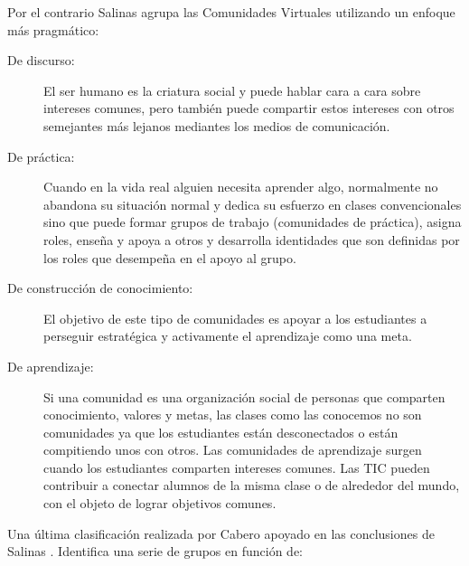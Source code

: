 Por el contrario Salinas \cite{salinas:2003} agrupa las Comunidades Virtuales utilizando un enfoque más pragmático: 

\begin{description}
\item[De discurso: ] 
El ser humano es la criatura social y puede hablar cara a cara sobre intereses comunes, pero también puede compartir estos intereses con otros semejantes más lejanos mediantes los medios de comunicación. 

\item[De práctica: ] 
Cuando en la vida real alguien necesita aprender algo, normalmente no abandona su situación normal y dedica su esfuerzo en clases convencionales sino que puede formar grupos de trabajo (comunidades de práctica), asigna roles, enseña y apoya a otros y desarrolla identidades que son definidas por los roles que desempeña en el apoyo al grupo. 

\item[De construcción de conocimiento: ] 
El objetivo de este tipo de comunidades es apoyar a los estudiantes a perseguir estratégica y activamente el aprendizaje como una meta. 

\item[De aprendizaje: ] 
Si una comunidad es una organización social de personas que comparten conocimiento, valores y metas, las clases como las conocemos no son comunidades ya que los estudiantes están desconectados o están compitiendo unos con otros. Las comunidades de aprendizaje surgen cuando los estudiantes comparten intereses comunes. Las TIC pueden contribuir a conectar alumnos de la misma clase o de alrededor del mundo, con el objeto de lograr objetivos comunes. 

\end{description}

Una última clasificación realizada por Cabero \cite{cabero} apoyado en las conclusiones de Salinas \cite{salinas:2003}. Identifica una serie de grupos en función de: 

